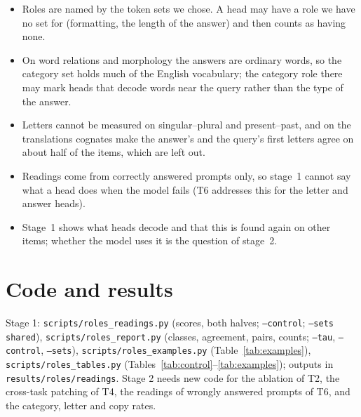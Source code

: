 \documentclass[10pt,a4paper]{article}
\begin{document}
\begin{itemize}
\item Roles are named by the token sets we chose. A head may have a role we have no set for (formatting, the length of the answer) and then counts as having none.
\item On word relations and morphology the answers are ordinary words, so the category set holds much of the English vocabulary; the category role there may mark heads that decode words near the query rather than the type of the answer.
\item Letters cannot be measured on singular--plural and present--past, and on the translations cognates make the answer's and the query's first letters agree on about half of the items, which are left out.
\item Readings come from correctly answered prompts only, so stage~1 cannot say what a head does when the model fails (T6 addresses this for the letter and answer heads).
\item Stage~1 shows what heads decode and that this is found again on other items; whether the model uses it is the question of stage~2.
\end{itemize}

\section*{Code and results}
\sloppy
Stage 1: \texttt{scripts/roles\_readings.py} (scores, both halves; \texttt{--control}; \texttt{--sets shared}), \texttt{scripts/roles\_report.py} (classes, agreement, pairs, counts; \texttt{--tau}, \texttt{--control}, \texttt{--sets}), \texttt{scripts/roles\_examples.py} (Table~\ref{tab:examples}), \texttt{scripts/roles\_tables.py} (Tables~\ref{tab:control}--\ref{tab:examples}); outputs in \texttt{results/roles/readings}. Stage 2 needs new code for the ablation of T2, the cross-task patching of T4, the readings of wrongly answered prompts of T6, and the category, letter and copy rates.
\end{document}
